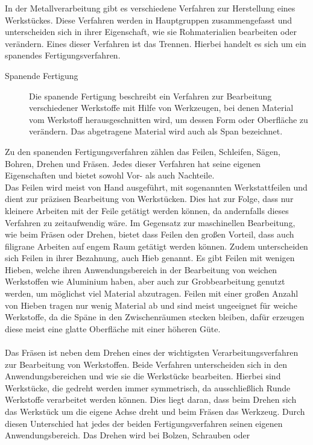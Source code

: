 In der Metallverarbeitung gibt es verschiedene Verfahren zur Herstellung eines Werkstückes. Diese Verfahren werden in Hauptgruppen zusammengefasst und 
unterscheiden sich in ihrer Eigenschaft, wie sie Rohmaterialien bearbeiten oder verändern. Eines dieser Verfahren ist das Trennen. Hierbei handelt es sich 
um ein spanendes Fertigungsverfahren.
\begin{description}
\item[Spanende Fertigung] Die spanende Fertigung beschreibt ein Verfahren zur Bearbeitung verschiedener Werkstoffe mit Hilfe von Werkzeugen, bei denen 
Material vom Werkstoff herausgeschnitten wird, um dessen Form oder Oberfläche zu verändern. Das abgetragene Material wird auch als Span bezeichnet. %
\end{description}
Zu den spanenden Fertigungsverfahren zählen \zB das Feilen, Schleifen, Sägen, Bohren, Drehen und Fräsen. Jedes dieser Verfahren hat seine eigenen 
Eigenschaften und bietet sowohl Vor- als auch Nachteile. 
\\
Das Feilen wird meist von Hand ausgeführt, mit sogenannten Werkstattfeilen und dient zur präzisen Bearbeitung von Werkstücken. Dies hat zur Folge, dass nur 
kleinere Arbeiten mit der Feile getätigt werden können, da andernfalls dieses Verfahren zu zeitaufwendig wäre. Im Gegensatz zur maschinellen Bearbeitung, 
wie \zB beim Fräsen oder Drehen, bietet dass Feilen den großen Vorteil, dass auch filigrane Arbeiten auf engem Raum getätigt werden können. Zudem 
unterscheiden sich Feilen in ihrer Bezahnung, auch Hieb genannt. Es gibt Feilen mit wenigen Hieben, welche ihren Anwendungsbereich in der Bearbeitung 
von weichen Werkstoffen wie Aluminium haben, aber auch zur Grobbearbeitung genutzt werden, um möglichst viel Material abzutragen. Feilen mit einer großen 
Anzahl von Hieben tragen nur wenig Material ab und sind meist ungeeignet für weiche Werkstoffe, da die Späne in den Zwischenräumen stecken bleiben, dafür 
erzeugen diese meist eine glatte Oberfläche mit einer höheren Güte. %
\\\\
Das Fräsen ist neben dem Drehen eines der wichtigsten Verarbeitungsverfahren zur Bearbeitung von Werkstoffen. Beide Verfahren unterscheiden sich in den 
Anwendungsbereichen und wie sie die Werkstücke bearbeiten. Hierbei sind Werkstücke, die gedreht werden immer symmetrisch, da ausschließlich Runde 
Werkstoffe verarbeitet werden können. Dies liegt daran, dass beim Drehen sich das Werkstück um die eigene Achse dreht und beim Fräsen das Werkzeug. 
Durch diesen Unterschied hat jedes der beiden Fertigungsverfahren seinen eigenen Anwendungsbereich. Das Drehen wird \zB bei Bolzen, Schrauben oder 
